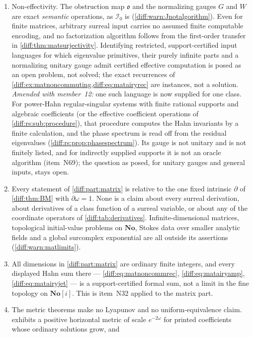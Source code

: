 \documentclass[11pt,letterpaper]{article}
\numberwithin{equation}{section}
\theoremstyle{definition}
\theoremstyle{remark}
\newcommand{\No}{\mathbf{No}}
\newcommand{\SC}{\mathbf{No}[i]}
\newcommand{\der}{\partial}
\newcommand{\Izero}{\mathcal I_{0}}
\newcommand{\Obs}{\mathfrak o}
\begin{document}
\begin{enumerate}[label=\textup{N\arabic*.},leftmargin=3.0em,itemsep=0.35em,start=53]
and~N12 for the eighth member, whose own text states it in those words.
\item Non-effectivity. The obstruction map $\Obs$ and the normalizing gauges
$G$ and $W$ are exact \emph{semantic} operations, as $\Izero$ is
(\cref{diff:warn:Jnotalgorithm}). Even for finite matrices, arbitrary surreal
input carries no assumed finite computable encoding, and no factorization
algorithm follows from the first-order transfer in
\cref{diff:thm:matsurjectivity}. Identifying restricted, support-certified
input languages for which eigenvalue primitives, their purely infinite parts
and a normalizing unitary gauge admit certified effective computation is posed
as an open problem, not solved; the exact recurrences of
\cref{diff:ex:matnoncommuting,diff:eq:matairyrec} are instances, not a
solution. \emph{Amended with member~12:} one such language is now supplied for
one class. For power-Hahn regular-singular systems with finite rational supports
and algebraic coefficients (or the effective coefficient operations of
\cref{diff:rs:sub:procedure}), that procedure computes the Hahn invariants
by a finite calculation, and the phase spectrum is read off from the residual
eigenvalues (\cref{diff:rs:prop:phasespectrum}). Its gauge is not unitary and is
not finitely listed, and for indirectly supplied supports it is not an oracle
algorithm (item~N69); the question as posed, for unitary gauges and general
inputs, stays open.
\item Every statement of \cref{diff:part:matrix} is relative to the one fixed
intrinsic $\der$ of \cref{diff:thm:BM} with $\der\omega=1$. None is a claim
about every surreal derivation, about derivatives of a class function of a
surreal variable, or about any of the coordinate operators of
\cref{diff:tab:derivatives}. Infinite-dimensional matrices, topological
initial-value problems on $\No$, Stokes data over smaller analytic fields and a
global surcomplex exponential are all outside its assertions
(\cref{diff:warn:matlimits}).
\item All dimensions in \cref{diff:part:matrix} are ordinary finite integers,
and every displayed Hahn sum there --- \cref{diff:eq:matnoncommrec},
\cref{diff:eq:matairyamp}, \cref{diff:eq:matairyjet} --- is a
support-certified formal sum, not a limit in the fine topology on $\SC$. This is
item~N32 applied to the matrix part.
\item The metric theorems make no Lyapunov and no uniform-equivalence claim.
 exhibits a positive horizontal metric of scale
$e^{-2\omega}$ for printed coefficients whose ordinary solutions grow, and

\end{enumerate}
\end{document}
